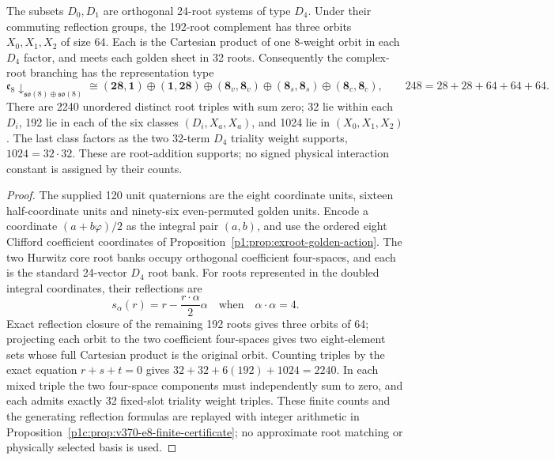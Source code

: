 \documentclass[11pt]{article}
\begin{document}
\begin{theorem}
\label{p1:thm:v370-e8-d4-triality}
The subsets $D_0,D_1$ are orthogonal 24-root systems of type $D_4$.
Under their commuting reflection groups, the 192-root complement has three
orbits $X_0,X_1,X_2$ of size 64.  Each is the Cartesian product of one
8-weight orbit in each $D_4$ factor, and meets each golden sheet in 32 roots.
Consequently the complex-root branching has the representation type
\[
 \mathfrak e_8\downarrow_{\mathfrak{so}(8)\oplus\mathfrak{so}(8)}
 \cong(\mathbf{28},\mathbf1)\oplus(\mathbf1,\mathbf{28})
 \oplus(\mathbf8_v,\mathbf8_v)
 \oplus(\mathbf8_s,\mathbf8_s)
 \oplus(\mathbf8_c,\mathbf8_c),
 \qquad248=28+28+64+64+64.
\]
There are 2240 unordered distinct root triples with sum zero; 32 lie
within each $D_i$, 192 lie in each of the six classes $(D_i,X_a,X_a)$,
and 1024 lie in $(X_0,X_1,X_2)$.  The last class factors as the two
32-term $D_4$ triality weight supports, $1024=32\cdot32$.
These are root-addition supports; no signed physical interaction constant is
assigned by their counts.
\end{theorem}
\begin{proof}
The supplied 120 unit quaternions are the eight coordinate units, sixteen
half-coordinate units and ninety-six even-permuted golden units.  Encode a
coordinate $(a+b\varphi)/2$ as the integral pair $(a,b)$, and use the ordered
eight Clifford coefficient coordinates of
Proposition~\ref{p1:prop:exroot-golden-action}.  The two Hurwitz core root
banks occupy orthogonal coefficient four-spaces, and each is the standard
24-vector $D_4$ root bank.  For roots represented in the doubled integral
coordinates, their reflections are
\[
 s_\alpha(r)=r-\frac{r\cdot\alpha}{2}\alpha
 \quad\text{when}\quad\alpha\cdot\alpha=4.
\]
Exact reflection closure of the remaining 192 roots gives three orbits of
64; projecting each orbit to the two coefficient four-spaces gives two
eight-element sets whose full Cartesian product is the original orbit.
Counting triples by the exact equation $r+s+t=0$ gives
$32+32+6(192)+1024=2240$.  In each mixed triple the two four-space
components must independently sum to zero, and each admits exactly 32
fixed-slot triality weight triples.  These finite counts and the generating
reflection formulas are replayed with integer arithmetic in
Proposition~\ref{p1c:prop:v370-e8-finite-certificate}; no approximate root
matching or physically selected basis is used.
\end{proof}
\end{document}
